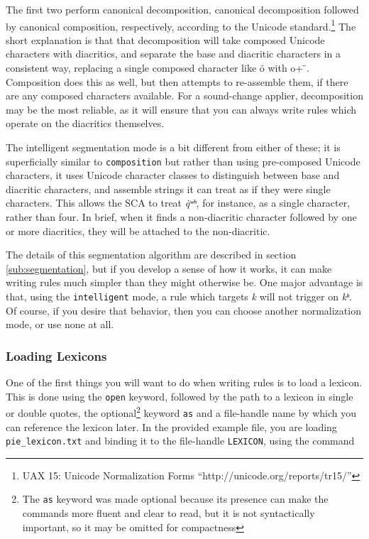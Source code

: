 \documentclass[10pt,letterpaper]{article}
\begin{document}
The first two perform canonical decomposition, canonical decomposition followed by canonical composition, respectively, according to the Unicode standard.\footnote{UAX 15: Unicode Normalization Forms ``http://unicode.org/reports/tr15/''} The short explanation is that that decomposition will take composed Unicode characters with diacritics, and separate the base and diacritic characters in a consistent way, replacing a single composed character like ö with o+ ̈. Composition does this as well, but then attempts to re-assemble them, if there are any composed characters available. For a sound-change applier, decomposition may be the most reliable, as it will ensure that you can always write rules which operate on the diacritics themselves.


The intelligent segmentation mode is a bit different from either of these; it is superficially similar to \texttt{composition} but rather than using pre-composed Unicode characters, it uses Unicode character classes to distinguish between base and diacritic characters, and assemble strings it can treat as if they were single characters. This allows the SCA to treat \emph{q̇ʷʰ}, for instance, as a single character, rather than four. In brief, when it finds a non-diacritic character followed by one or more diacritics, they will be attached to the non-diacritic.

The details of this segmentation algorithm are described in section \ref{sub:segmentation}, but if you develop a sense of how it works, it can make writing rules much simpler than they might otherwise be. One major advantage is that, using the \texttt{intelligent} mode, a rule which targets \emph{k} will not trigger on \emph{kʰ}. Of course, if you desire that behavior, then you can choose another normalization mode, or use none at all.


\subsubsection{Loading Lexicons}
\label{ssub:loading_lexicons}
One of the first things you will want to do when writing rules is to load a lexicon. This is done using the \texttt{open} keyword, followed by the path to a lexicon in single or double quotes, the optional\footnote{The \texttt{as} keyword was made optional because its presence can make the commands more fluent and clear to read, but it is not syntactically important, so it may be omitted for compactness} keyword \texttt{as} and a file-handle name by which you can reference the lexicon later. In the provided example file, you are loading \texttt{pie\_lexicon.txt} and binding it to the file-handle \texttt{LEXICON}, using the command
\end{document}
